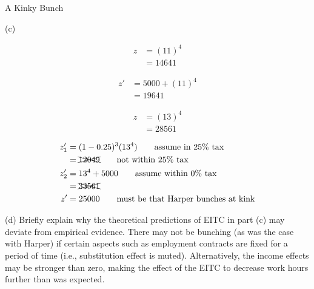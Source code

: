 \documentclass[10pt]{extarticle}
\begin{document}
\begin{problem}{A Kinky Bunch}
\begin{problem}{(c)}
\begin{description}[font=\normalfont]
          \begin{align*}
            z &= (11)^{4}\\
              &= 14641
          \end{align*}
        \item[Maria with EITC:]
          \begin{align*}
            z' &= 5000 + (11)^{4}\\
               &= 19641 \tag*{within $0\%$ subsidy, so valid}
          \end{align*}
        \item[Harper without EITC:]
          \begin{align*}
            z &= (13)^{4}\\
              &= 28561
          \end{align*}
        \item[Harper with EITC:]
          \begin{align*}
            z'_{1} &= (1-0.25)^3(13^4)\tag*{assume in $25\%$ tax}\\
              &= \xcancel{12049} \tag*{not within $25\%$ tax}\\
            z'_{2} &= 13^{4} + 5000 \tag*{assume within $0\%$ tax}\\
                   &= \xcancel{33561}\\
            z' &= 25000 \tag*{must be that Harper bunches at kink}
          \end{align*}
      \end{description}
    \end{problem}
    \begin{problem}{(d)}
      Briefly explain why the theoretical predictions of EITC in part (c) may deviate from empirical evidence.
      \tcblower
      There may not be bunching (as was the case with Harper) if certain aspects such as employment contracts are fixed for a period of time (i.e., substitution effect is muted). Alternatively, the income effects may be stronger than zero, making the effect of the EITC to decrease work hours further than was expected.
    \end{problem}
  \end{problem}
\end{document}
